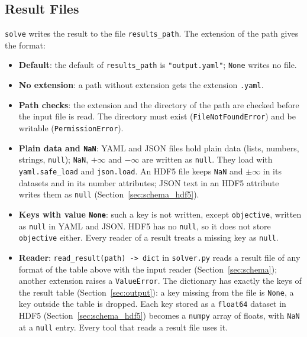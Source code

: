 \subsection{Result Files}\label{sec:output_files}

\texttt{solve} writes the result to the file \texttt{results\_path}. The extension of the path gives the format:

\tabend

\begin{itemize}[nosep,leftmargin=1.5em]
  \item \textbf{Default}: the default of \texttt{results\_path} is \texttt{"output.yaml"}; \texttt{None} writes no file.
  \item \textbf{No extension}: a path without extension gets the extension \texttt{.yaml}.
  \item \textbf{Path checks}: the extension and the directory of the path are checked before the input file is read. The directory must exist (\texttt{FileNotFoundError}) and be writable (\texttt{PermissionError}).
  \item \textbf{Plain data and \texttt{NaN}}: YAML and JSON files hold plain data (lists, numbers, strings, \texttt{null}); \texttt{NaN}, $+\infty$ and $-\infty$ are written as \texttt{null}. They load with \texttt{yaml.safe\_load} and \texttt{json.load}. An HDF5 file keeps \texttt{NaN} and $\pm\infty$ in its datasets and in its number attributes; JSON text in an HDF5 attribute writes them as \texttt{null} (Section~\ref{sec:schema_hdf5}).
  \item \textbf{Keys with value \texttt{None}}: such a key is not written, except \texttt{objective}, written as \texttt{null} in YAML and JSON. HDF5 has no \texttt{null}, so it does not store \texttt{objective} either. Every reader of a result treats a missing key as \texttt{null}.
  \item \textbf{Reader}: \texttt{read\_result(path) -> dict} in \texttt{solver.py} reads a result file of any format of the table above with the input reader (Section~\ref{sec:schema}); another extension raises a \texttt{ValueError}. The dictionary has exactly the keys of the result table (Section~\ref{sec:output}): a key missing from the file is \texttt{None}, a key outside the table is dropped. Each key stored as a \texttt{float64} dataset in HDF5 (Section~\ref{sec:schema_hdf5}) becomes a \texttt{numpy} array of floats, with \texttt{NaN} at a \texttt{null} entry. Every tool that reads a result file uses it.
\end{itemize}


